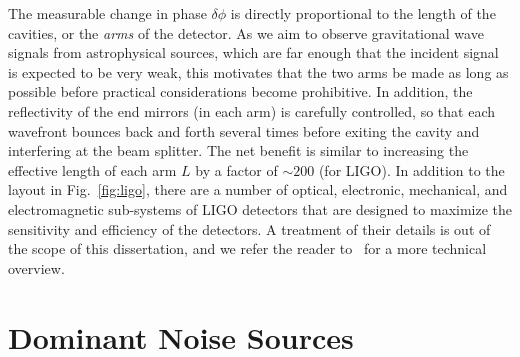 The measurable change in phase $\delta\phi$ is directly 
proportional to the length of the cavities, or the {\it arms} of the detector.
As we aim to observe gravitational wave signals from 
astrophysical sources, which are far enough that the incident signal is
expected to be very weak, this motivates that the two arms be made as 
long as possible before practical considerations become prohibitive.
% 
In addition, the reflectivity of the end mirrors (in each arm) is carefully
controlled, so that each 
wavefront bounces back and forth several times before exiting the cavity and 
interfering at the beam splitter. The net benefit is similar to increasing the
effective length of each arm $L$ by a factor of $\sim 200$ (for LIGO). 
% 
In addition to the layout in Fig.~\ref{fig:ligo}, there are a number of
optical, electronic, mechanical, and electromagnetic sub-systems of LIGO 
detectors that are designed to maximize the sensitivity and efficiency of the detectors.
A treatment of their details is out of the scope of this dissertation, and we
refer the reader to~\cite{lrr-2011-5,Harry:2010zz} for a more technical overview.



\section{Dominant Noise Sources}\label{sec:ligo_noise}

